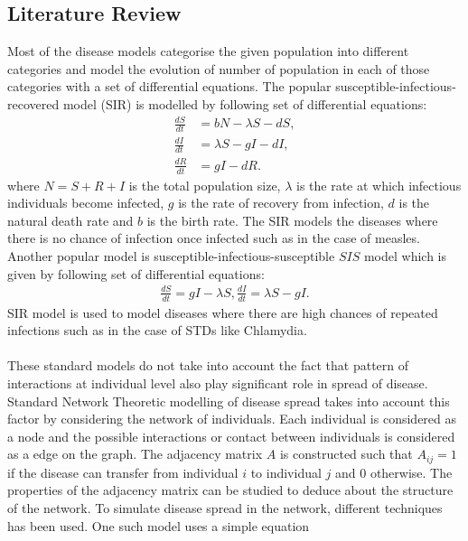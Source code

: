 \documentclass[11pt]{article}
\begin{document}
\subsection{Literature Review}
Most of the disease models categorise the given population into different categories and model the evolution of number of population in each of those categories with a set of differential equations. The popular susceptible-infectious-recovered model (SIR) is modelled by following set of differential equations:
\begin{equation}
\begin{align*}
\frac{dS}{dt} &= bN - \lambda S - dS,\\
\frac{dI}{dt} &= \lambda S - gI - dI,\\
\frac{dR}{dt} &= gI - dR.
\end{align*}
\end{equation}
where $N = S + R + I$ is the total population size, $\lambda$ is the rate at which infectious individuals become infected, $g$ is the rate of recovery from infection, $d$ is the natural death rate and $b$ is the birth rate. The SIR models the diseases where there is no chance of infection once infected such as in the case of measles. Another popular model is susceptible-infectious-susceptible $SIS$ model which is given by following set of differential equations:
\begin{equation}
\begin{align*}
\frac{dS}{dt} = gI - \lambda S,
\frac{dI}{dt} = \lambda S - gI.
\end{align*}
\end{equation}
SIR model is used to model diseases where there are high chances of repeated infections such as in the case of STDs like Chlamydia.\\
\\
These standard models do not take into account the fact that pattern of interactions at individual level also play significant role in spread of disease. Standard Network Theoretic modelling of disease spread takes into account this factor by considering the network of individuals. Each individual is considered as a node and the possible interactions or contact between individuals is considered as a edge on the graph. The adjacency matrix $A$ is constructed such that $A_{ij} = 1$ if the disease can transfer from individual $i$ to individual $j$ and $0$ otherwise. The properties of the adjacency matrix can be studied to deduce about the structure of the network. To simulate disease spread in the network, different techniques has been used. One such model uses a simple equation
\end{document}
